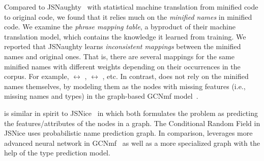





Compared to JSNaughty~\cite{JSNaughty2017} with statistical machine
translation from minified code to original code, we found that it
relies much on the {\em minified names} in minified code. We examine
the {\em phrase mapping table}, a byproduct of their machine
translation model, which contains the knowledge it learned from
training. We reported that JSNaughty learns {\em inconsistent
  mappings} between the minified names and original ones. That is,
there are several mappings for the same minified names with different
weights depending on their occurrences in the corpus. For example,
 $\leftrightarrow$ ,  $\leftrightarrow$
, etc. In contrast, {\tool} does not rely on the minified
names themselves, by modeling them as the nodes with
missing features (i.e., missing names and types) in the graph-based GCNmf
model~\cite{GCNmf}.

{\tool} is similar in spirit to JSNice~\cite{JSNice2015} in which both
formulates the problem as predicting the features/attributes of the
nodes in a graph. The Conditional Random Field in JSNice uses
probabilistic name prediction graph. In comparison, {\tool} leverages
more advanced neural network in GCNmf~\cite{GCNmf} as well as a more
specialized graph with the help of the type prediction model.






